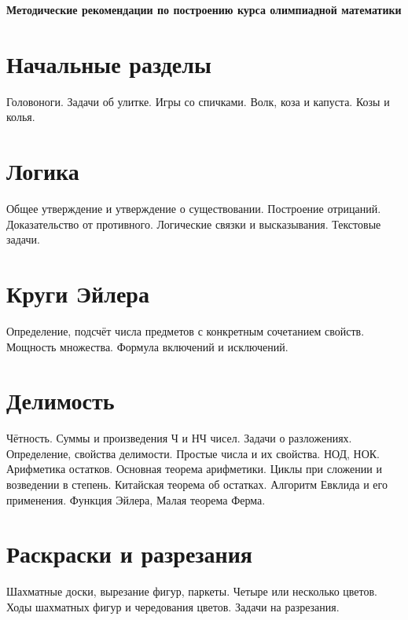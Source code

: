 \documentclass[a4paper,11pt,landscape]{article}
\begin{document}
 \thispagestyle{empty}

\begin{center}
    \Large \textbf{Методические рекомендации по построению курса олимпиадной математики}
\end{center}\vspace{-2mm}


\begin{paracol}{2}

\setlength{\columnsep}{0.9cm}

\section{Начальные разделы}

Головоноги. Задачи об улитке. Игры со спичками. Волк, коза и капуста. Козы и колья.

\section{Логика}

Общее утверждение и утверждение о существовании. Построение отрицаний. Доказательство от противного. Логические связки и высказывания. Текстовые задачи. 
\section{Круги Эйлера}

Определение, подсчёт числа предметов с конкретным сочетанием свойств. Мощность множества. Формула включений и исключений.

\section{Делимость}

Чётность. Суммы и произведения Ч и НЧ чисел. Задачи о разложениях. Определение, свойства делимости. Простые числа и их свойства. НОД, НОК. Арифметика остатков. Основная теорема арифметики. Циклы при сложении и возведении в степень. Китайская теорема об остатках. Алгоритм Евклида и его применения. Функция Эйлера, Малая теорема Ферма.

\section{Раскраски и разрезания}

Шахматные доски, вырезание фигур, паркеты. Четыре или несколько цветов. Ходы шахматных фигур и чередования цветов. Задачи на разрезания. 


\end{paracol}
\end{document}
